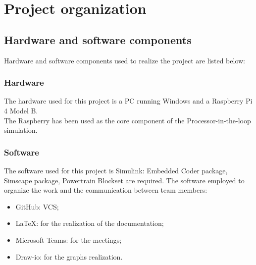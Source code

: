 \documentclass[12pt,a4paper]{report}
\begin{document}
\chapter{Project organization}
\section{Hardware and software components}
Hardware and software components used to realize the project are listed below:
\subsection{Hardware}
The hardware used for this project is a PC running Windows and a Raspberry Pi 4 Model B.\\
The Raspberry has been used as the core component of the Processor-in-the-loop simulation.
\subsection{Software}
The software used for this project is Simulink: Embedded Coder package, Simscape package, Powertrain Blockset are required.
The software employed to organize the work and the communication between team members:
\begin{itemize}
	\item GitHub: VCS;
	\item LaTeX: for the realization of the documentation;
	\item Microsoft Teams: for the meetings;
	\item Draw-io: for the graphs realization.
\end{itemize}
\end{document}
